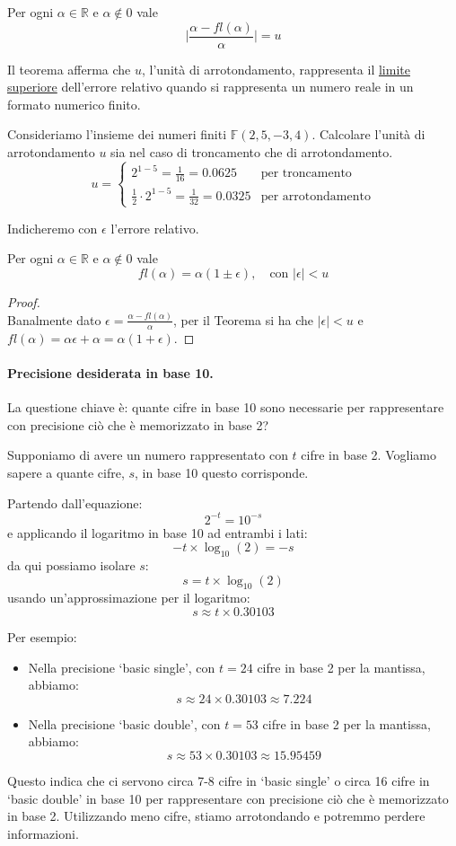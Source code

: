 \documentclass{article}
\begin{document}
\begin{theorem}
   Per ogni $\alpha\in \mathbb{R}$ e $\alpha\notin0$ vale
   $$\Big\lvert \frac{\alpha-fl(\alpha)}{\alpha}\Big\rvert=u$$
\end{theorem}
Il teorema afferma che $u$, l'unità di arrotondamento, rappresenta il
\underline{limite superiore} dell'errore relativo quando si rappresenta 
un numero reale in un formato numerico finito.
\begin{example}
    Consideriamo l'insieme dei numeri finiti $\mathbb{F}(2,5,-3,4)$. Calcolare l'unità di arrotondamento $u$ sia nel caso di troncamento che di
    arrotondamento.
    $$u=\begin{cases}
        2^{1-5}=\frac{1}{16}=0.0625 & \text{per
        troncamento} \\
        \frac{1}{2}\cdot2^{1-5}=\frac{1}{32}=0.0325 & \text{per arrotondamento}
    \end{cases}$$
\end{example}
Indicheremo con $\epsilon$ l'errore relativo.
\begin{corollary}
    Per ogni $\alpha\in \mathbb{R}$ e $\alpha\notin0$ vale 
    $$  fl(\alpha)=\alpha(1\pm\epsilon),\quad \text{con }\lvert 
      \epsilon\rvert<u $$
\end{corollary} 
\begin{proof}\leavevmode\\
    Banalmente dato $\epsilon=\frac{\alpha-fl(\alpha)}{\alpha}$,
    per il Teorema si ha che $\lvert \epsilon\rvert<u$ e
    $fl(\alpha)=\alpha\epsilon+\alpha=\alpha(1+\epsilon)$.
\end{proof}
\paragraph{Precisione desiderata in base 10.}
La questione chiave è: quante cifre in base 10 sono necessarie per
rappresentare con precisione ciò che è memorizzato in base 2? 

Supponiamo di avere un numero rappresentato con $t$ cifre in base 2. Vogliamo
sapere a quante cifre, $s$, in base 10 questo corrisponde.

Partendo dall'equazione:
$$2^{-t}=10^{-s}$$
e applicando il logaritmo in base 10 ad entrambi i lati:
$$-t\times\log_{10}(2)=-s$$
da qui possiamo isolare $s$:
$$s=t\times\log_{10}(2)$$
usando un'approssimazione per il logaritmo:
$$s \approx t \times 0.30103$$

Per esempio:
\begin{itemize}
\item Nella precisione `basic single', con \( t = 24 \) cifre in base 2 per la mantissa, abbiamo:
$$s \approx 24 \times 0.30103 \approx 7.224$$
\item Nella precisione `basic double', con \( t = 53 \) cifre in base 2 per la mantissa, abbiamo:
$$s \approx 53 \times 0.30103 \approx 15.95459$$
\end{itemize}
Questo indica che ci servono circa 7-8 cifre in `basic single' o circa 16
cifre in `basic double' in base 10 per rappresentare con
precisione ciò che è memorizzato in base 2. Utilizzando meno cifre, stiamo
arrotondando e potremmo perdere informazioni.
\end{document}

